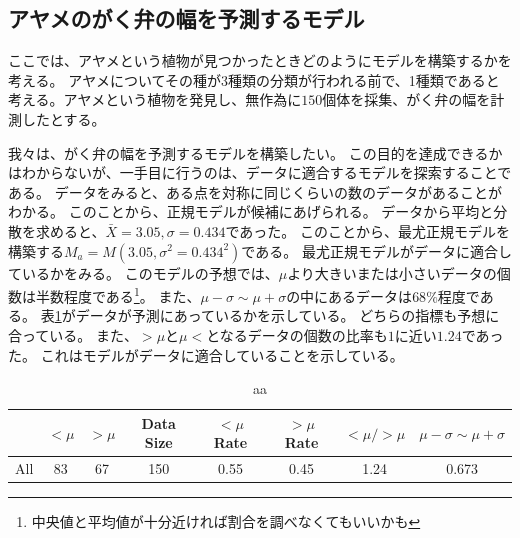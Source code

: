 \subsection{アヤメのがく弁の幅を予測するモデル}
ここでは、アヤメという植物が見つかったときどのようにモデルを構築するかを考える。
アヤメについてその種が3種類の分類が行われる前で、1種類であると考える。アヤメという植物を発見し、無作為に$150$個体を採集、がく弁の幅を計測したとする。

我々は、がく弁の幅を予測するモデルを構築したい。
この目的を達成できるかはわからないが、一手目に行うのは、データに適合するモデルを探索することである。
データをみると、ある点を対称に同じくらいの数のデータがあることがわかる。
このことから、正規モデルが候補にあげられる。
データから平均と分散を求めると、$\bar{X}=3.05,\sigma=0.434$であった。
このことから、最尤正規モデルを構築する$M_a=M(3.05,\sigma^2=0.434^2)$である。
最尤正規モデルがデータに適合しているかをみる。
このモデルの予想では、$\mu$より大きいまたは小さいデータの個数は半数程度である\footnote{中央値と平均値が十分近ければ割合を調べなくてもいいかも}。
また、$\mu-\sigma \sim \mu+\sigma$の中にあるデータは$68\%$程度である。
表\ref{table:all_spael_width_table}がデータが予測にあっているかを示している。
どちらの指標も予想に合っている。
また、$>\mu$と$\mu<$となるデータの個数の比率も$1$に近い$1.24$であった。
これはモデルがデータに適合していることを示している。
\begin{table}[h]
    \caption{aa}
    \label{table:all_spael_width_table}
    \centering
    \begin{tabular}{lccccccc}
        \hline
        {} &  $<\mu$ &  $>\mu$ &  Data Size &  $<\mu$ Rate &  $>\mu$ Rate &  $<\mu/>\mu$ & $\mu-\sigma\sim\mu+\sigma$\\
        \hline
        All    &    83 &    67 &        150 &       0.55 &       0.45 &       1.24 & 0.673\\
        \hline
    \end{tabular}
\end{table}


